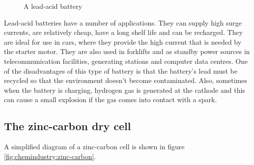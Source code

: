 \begin{center}
\begin{figure}[h]
\caption{A lead-acid battery}
\label{fig:chemindustry:lead-acid}
\end{figure}
\end{center}

Lead-acid batteries have a number of applications. They can supply high surge currents, are relatively cheap, have a long shelf life and can be recharged. They are ideal for use in cars, where they provide the high current that is needed by the starter motor. They are also used in forklifts and as standby power sources in telecommunication facilities, generating stations and computer data centres. One of the disadvantages of this type of battery is that the battery's lead must be recycled so that the environment doesn't become contaminated. Also, sometimes when the battery is charging, hydrogen gas is generated at the cathode and this can cause a small explosion if the gas comes into contact with a spark.

\subsection{The zinc-carbon dry cell}

A simplified diagram of a zinc-carbon cell is shown in figure \ref{fig:chemindustry:zinc-carbon}.

